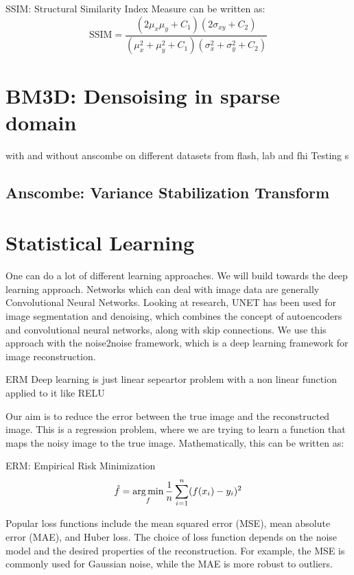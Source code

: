 SSIM: Structural Similarity Index Measure can be written as:
\begin{equation}
    \text{SSIM} = \frac{(2\mu_x\mu_y + C_1)(2\sigma_{xy} + C_2)}{(\mu_x^2 + \mu_y^2 + C_1)(\sigma_x^2 + \sigma_y^2 + C_2)}
\end{equation}

\section{BM3D: Densoising in sparse domain}
with and without anscombe on different datasets from flash, lab and fhi
Testing s
\subsection{Anscombe: Variance Stabilization Transform}

\section{Statistical Learning}
One can do a lot of different learning approaches. We will build towards the deep learning approach. Networks which can deal with image data are generally Convolutional Neural Networks. Looking at research, UNET has been used for image segmentation and denoising, which combines the concept of autoencoders and convolutional neural networks, along with skip connections.
We use this approach with the noise2noise framework, which is a deep learning framework for image reconstruction.

ERM 
Deep learning is just linear sepeartor problem with a non linear function applied to it like RELU

Our aim is to reduce the error between the true image and the reconstructed image. This is a regression problem, where we are trying to learn a function that maps the noisy image to the true image. Mathematically, this can be written as:

ERM: Empirical Risk Minimization
\begin{equation}
    \hat{f} = \operatorname*{arg\,min}_f \frac{1}{n} \sum_{i=1}^{n} (f(x_i) - y_i)^{2}
\end{equation}

Popular loss functions include the mean squared error (MSE), mean absolute error (MAE), and Huber loss. The choice of loss function depends on the noise model and the desired properties of the reconstruction. For example, the MSE is commonly used for Gaussian noise, while the MAE is more robust to outliers.

